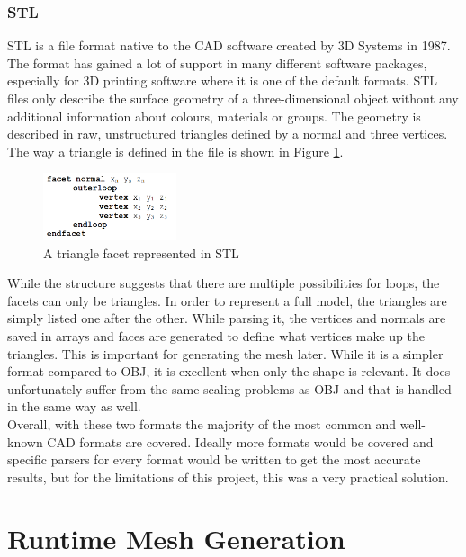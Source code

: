 \subsubsection{STL}
STL is a file format native to the \acs{CAD} software created by 3D Systems in 1987\cite{bib:STL}. The format has gained a lot of support in many different software packages, especially for 3D printing software where it is one of the default formats. STL files only describe the surface geometry of a three-dimensional object without any additional information about colours, materials or groups. The geometry is described in raw, unstructured triangles defined by a normal and three vertices. The way a triangle is defined in the file is shown in Figure \ref{fig:STLFormat}. 
\begin{figure}[htpb]
	\centering
	\includegraphics[width=0.35\textwidth]{fig/STLFormat.png}
	\caption[STL Triangle facet]{A triangle facet represented in STL\protect}
	\label{fig:STLFormat}
\end{figure}

While the structure suggests that there are multiple possibilities for loops, the facets can only be triangles. In order to represent a full model, the triangles are simply listed one after the other. While parsing it, the vertices and normals are saved in arrays and faces are generated to define what vertices make up the triangles. This is important for generating the mesh later. While it is a simpler format compared to OBJ, it is excellent when only the shape is relevant. It does unfortunately suffer from the same scaling problems as OBJ and that is handled in the same way as well.\\
Overall, with these two formats the majority of the most common and well-known \acs{CAD} formats are covered. Ideally more formats would be covered and specific parsers for every format would be written to get the most accurate results, but for the limitations of this project, this was a very practical solution.

\section{Runtime Mesh Generation}\label{chp:}

